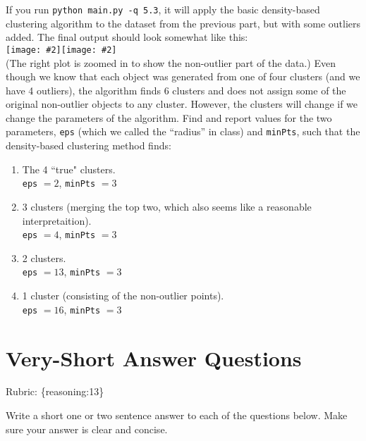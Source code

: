 \documentclass{article}
\def\rubric#1{\gre{Rubric: \{#1\}}}{}
\def\blu#1{{\color{blu}#1}}
\def\gre#1{{\color{gre}#1}}
\def\ans#1{{\color{ans}#1}}
\newcommand{\fig}[2]{\texttt{[image: \#2]}}
\def\enum#1{\begin{enumerate}#1\end{enumerate}}
\begin{document}
If you run \texttt{python main.py -q 5.3},
it will apply the basic density-based clustering algorithm to the dataset from the previous part, but with some outliers added.
The final output should look somewhat like this:\\
\fig{.49}{../figs/density}\fig{.49}{../figs/density2}\\
(The right plot is zoomed in to show the non-outlier part of the data.)
Even though we know that each object was generated from one of four clusters (and we have 4 outliers),
 the algorithm finds 6 clusters and does not assign some of the original non-outlier
  objects to any cluster. However, the clusters will change if we change the parameters
  of the algorithm. Find and report values for the two
  parameters, \texttt{eps} (which we called the ``radius'' in class) and \texttt{minPts},
   such that the density-based clustering method finds:
\blu{\enum{
\item The 4 ``true" clusters. \\
\ans{
   \texttt{eps} $= 2$, \texttt{minPts} $= 3$
}
\item 3 clusters (merging the top two, which also seems like a reasonable interpretaition). \\
\ans{
   \texttt{eps} $= 4$, \texttt{minPts} $= 3$
}
\item 2 clusters. \\
\ans{
   \texttt{eps} $= 13$, \texttt{minPts} $= 3$
}
\item 1 cluster (consisting of the non-outlier points). \\
\ans{
   \texttt{eps} $= 16$, \texttt{minPts} $= 3$
}
}
}



\section{Very-Short Answer Questions}
\rubric{reasoning:13}

\blu{Write a short one or two sentence answer to each of the questions below}. Make sure your answer is clear and concise.
\end{document}
